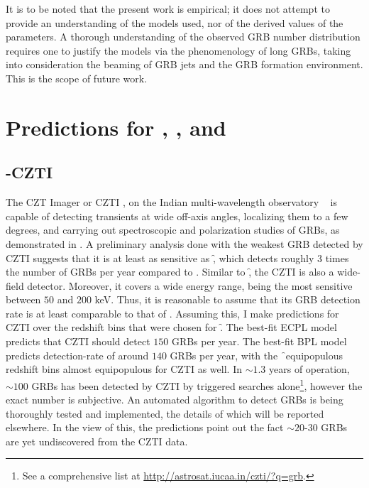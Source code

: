 It is to be noted that the present work is empirical; it does not attempt to provide an understanding of the models used, nor of the derived values of the parameters. A thorough understanding of the observed GRB number distribution requires one to justify the models via the phenomenology of long GRBs, taking into consideration the beaming of GRB jets and the GRB formation environment. This is the scope of future work.



\section{Predictions for \AS, \A, and \D}
\label{sec:predictions--long}

\subsection{\AS-CZTI}
\label{subsec:predictions_for_CZTI--long}
The CZT Imager or CZTI \citep{Bhalerao_et_al.-2017-JApA}, on the Indian multi-wavelength observatory \AS\ \citep{Rao_et_al.-2016-arXiv-Astrosat} is capable of detecting transients at wide off-axis angles, localizing them to a few degrees, and carrying out spectroscopic and polarization studies of GRBs, as demonstrated in \cite{Rao_et_al.-2016-ApJ}. A preliminary analysis done with the weakest GRB detected by CZTI suggests that it is at least as sensitive as \f, which detects roughly $3$ times the number of GRBs per year compared to \s. Similar to \f, the CZTI is also a wide-field detector. Moreover, it covers a wide energy range, being the most sensitive between $50$ and $200$ keV. Thus, it is reasonable to assume that its GRB detection rate is at least comparable to that of \s. Assuming this, I make predictions for CZTI over the redshift bins that were chosen for \f. The best-fit ECPL model predicts that CZTI should detect $150$ GRBs per year. The best-fit BPL model predicts detection-rate of around $140$ GRBs per year, with the \f\ equipopulous redshift bins almost equipopulous for CZTI as well. In $\sim 1.3$ years of operation, $\sim 100$ GRBs has been detected by CZTI by triggered searches alone\footnote{See a comprehensive list at \url{http://astrosat.iucaa.in/czti/?q=grb}.}, however the exact number is subjective. An automated algorithm to detect GRBs is being thoroughly tested and implemented, the details of which will be reported elsewhere. In the view of this, the predictions point out the fact $\sim 20$-$30$ GRBs are yet undiscovered from the CZTI data.

